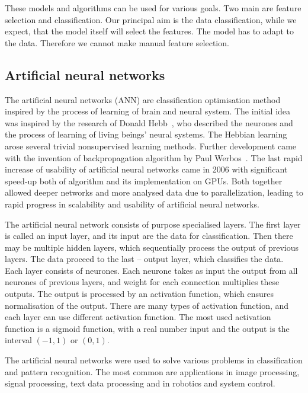 \documentclass[
  print, %
  Table,   %
  nolof,     %
  nolot,     %
  11pt, %
  oneside  %
]{fithesis3}
\newcommand{\todo}[1]{TODO: \textit{#1}}
\begin{document}
These models and algorithms can be used for various goals. Two main are feature selection and classification. Our principal aim is the data classification, while we expect, that the model itself will select the features. The model has to adapt to the data. Therefore we cannot make manual feature selection.

\subsection{Artificial neural networks}
\label{subsec:opt-other-ann}

The artificial neural networks (ANN) are classification optimisation method inspired by the process of learning of brain and neural system. The initial idea was inspired by the research of Donald Hebb~\cite{hebb49learning}, who described the neurones and the process of learning of living beings' neural systems. The Hebbian learning arose several trivial nonsupervised learning methods. Further development came with the invention of backpropagation algorithm by Paul Werbos~\cite{werbos75beyondThesis}. The last rapid increase of usability of artificial neural networks came in 2006 with significant speed-up both of algorithm and its implementation on GPUs. Both together allowed deeper networks and more analysed data due to parallelization, leading to rapid progress in scalability and usability of artificial neural networks.

The artificial neural network consists of purpose specialised layers. The first layer is called an input layer, and its input are the data for classification. Then there may be multiple hidden layers, which sequentially process the output of previous layers. The data proceed to the last -- output layer, which classifies the data. Each layer consists of neurones. Each neurone takes as input the output from all neurones of previous layers, and weight for each connection multiplies these outputs. The output is processed by an activation function, which ensures normalisation of the output. There are many types of activation function, and each layer can use different activation function. The most used activation function is a sigmoid function, with a real number input and the output is the interval $(-1, 1)$ or $(0, 1)$.

The artificial neural networks were used to solve various problems in classification and pattern recognition. The most common are applications in image processing, signal processing, text data processing and in robotics and system control.
\end{document}
